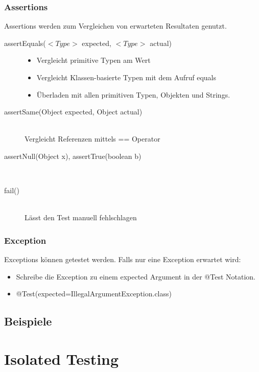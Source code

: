 \documentclass[a4paper,10pt]{article}
\begin{document}
\subsubsection{Assertions}
Assertions werden zum Vergleichen von erwarteten Resultaten genutzt.
\begin{description}
	\item[assertEquals($<Type>$ expected, $<Type>$ actual)] \hfill
		\begin{itemize}
			\item Vergleicht primitive Typen am Wert
			\item Vergleicht Klassen-basierte Typen mit dem Aufruf equals
			\item Überladen mit allen primitiven Typen, Objekten und Strings.
		\end{itemize}
	\item[assertSame(Object expected, Object actual)] \hfill \\
		Vergleicht Referenzen mittels == Operator
	\item[assertNull(Object x), assertTrue(boolean b)] \hfill \\
	\item[fail()] \hfill \\
		Lässt den Test manuell fehlschlagen
\end{description}

\subsubsection{Exception}
Exceptions können getestet werden. Falls nur eine Exception erwartet wird:
\begin{itemize}
	\item Schreibe die Exception zu einem expected Argument in der @Test Notation.
	\item @Test(expected=IllegalArgumentException.class)
\end{itemize}

\subsection{Beispiele}


\pagebreak
\section{Isolated Testing}
\end{document}
